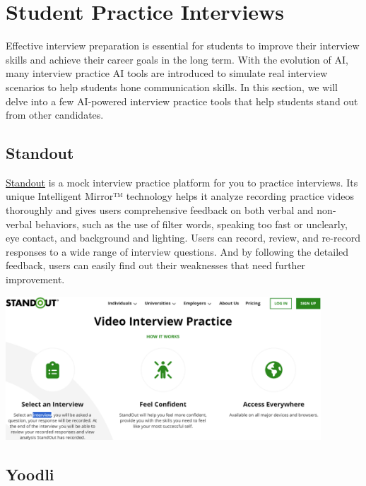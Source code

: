 \documentclass[
]{book}
\begin{document}
\hypertarget{student-practice-interviews}{%
\chapter{Student Practice Interviews}\label{student-practice-interviews}}

Effective interview preparation is essential for students to improve their interview skills and achieve their career goals in the long term. With the evolution of AI, many interview practice AI tools are introduced to simulate real interview scenarios to help students hone communication skills. In this section, we will delve into a few AI-powered interview practice tools that help students stand out from other candidates.

\hypertarget{standout}{%
\section{Standout}\label{standout}}

\href{https://standout.com/}{Standout} is a mock interview practice platform for you to practice interviews. Its unique Intelligent Mirror™ technology helps it analyze recording practice videos thoroughly and gives users comprehensive feedback on both verbal and non-verbal behaviors, such as the use of filter words, speaking too fast or unclearly, eye contact, and background and lighting. Users can record, review, and re-record responses to a wide range of interview questions. And by following the detailed feedback, users can easily find out their weaknesses that need further improvement.

\includegraphics[width=4.64583in,height=\textheight]{standout pic.png}

\hypertarget{yoodli}{%
\section{Yoodli}\label{yoodli}}
\end{document}
